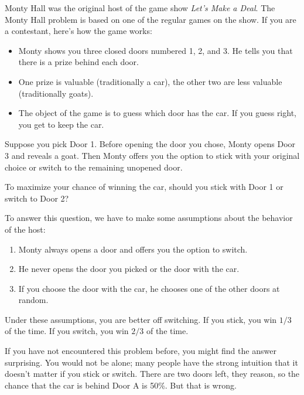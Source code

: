 \documentclass[12pt]{book}
\theoremstyle{exercise}
\begin{document}

Monty Hall was the original host of the game show {\em Let's Make a
Deal}.  
The Monty Hall problem is based on one of the regular
games on the show.  
If you are a contestant, here's how the game works:

\begin{itemize}

\item Monty shows you three closed doors numbered 1, 2, and 3.
He tells you that there is a prize behind each door.

\item One prize is valuable (traditionally a car), the other two are less valuable (traditionally goats).

\item The object of the game is to guess which door has the car.  
If you guess right, you get to keep the car.

\end{itemize}

Suppose you pick Door 1.
Before opening the door you chose, Monty opens Door 3 and reveals a
goat.
Then Monty offers you the option to stick with your original
choice or switch to the remaining unopened door.

To maximize your chance of winning the car, should you stick with Door 1 or switch to Door 2?

To answer this question, we have to make some assumptions about the behavior of the host:

\begin{enumerate}

\item Monty always opens a door and offers you the option to switch.

\item He never opens the door you picked or the door with the car.

\item  If you choose the door with the car, he chooses one of the other doors at random.

\end{enumerate}

Under these assumptions, you are better off switching.  
If you stick, you win $1/3$ of the time.  
If you switch, you win $2/3$ of the time.

If you have not encountered this problem before, you might find the answer surprising.
You would not be alone; many people have the strong intuition that it doesn't matter if you stick or switch.
There are two doors left, they reason, so the chance that the car
is behind Door A is 50\%.
But that is wrong.
\end{document}
